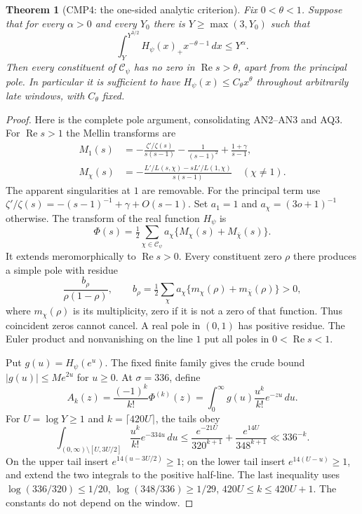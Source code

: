 \documentclass[11pt,a4paper]{article}
\numberwithin{equation}{section}
\newtheorem{theorem}{Theorem}[section]
\theoremstyle{remark}\newtheorem{remark}[theorem]{Remark}
\begin{document}
\begin{theorem}[CMP4: the one-sided analytic criterion]
\label{claim:CMP4}
Fix $0<\theta<1$.  Suppose that for every $\alpha>0$ and every
$Y_0$ there is $Y\ge\max(3,\allowbreak{} Y_0)$ such that
\[
       \int_Y^{Y^{3/2}}H_\psi(x)_+x^{-\theta-1}\,\allowbreak{} dx\le Y^\alpha.
 \tag{CMP.15}
\]
Then every constituent of $\mathcal C_\psi$ has no zero in
$\operatorname{Re}s>\theta$, apart from the principal pole.
In particular it is sufficient to have
$H_\psi(x)\le C_\theta x^\theta$ throughout arbitrarily late
windows, with $C_\theta$ fixed.
\end{theorem}
\begin{proof}
Here is the complete pole argument, consolidating AN2--AN3 and AQ3.
For $\operatorname{Re}s>1$ the Mellin transforms are
\begin{align*}
 M_1(s)&=-\frac{\zeta'/\zeta(s)}{s(s-1)}
             -\frac1{(s-1)^2}+\frac{1+\gamma}{s-1},\\
 M_\chi(s)&=-\frac{L'/L(s,\chi)-sL'/L(1,\chi)}{s(s-1)}
                                                    \quad(\chi\ne1).
\end{align*}
The apparent singularities at $1$ are removable.  For the principal
term use $\zeta'/\zeta(s)=-(s-1)^{-1}+\gamma+O(s-1)$.
Set $a_1=1$ and $a_\chi=(3o+1)^{-1}$ otherwise.  The transform
of the real function $H_\psi$ is
\[
 \Phi(s)=\tfrac12\sum_{\chi\in\mathcal C_\psi}
                    a_\chi\{M_\chi(s)+M_{\bar\chi}(s)\}.
\]
It extends meromorphically to $\operatorname{Re}s>0$.  Every
constituent zero $\rho$ there produces a simple pole with residue
\[
 \frac{b_\rho}{\rho(1-\rho)},\qquad
 b_\rho=\tfrac12\sum_\chi a_\chi
                    \{m_\chi(\rho)+m_{\bar\chi}(\rho)\}>0,
                                                               \tag{CMP.16}
\]
where $m_\chi(\rho)$ is its multiplicity, zero if it is not a
zero of that function.  Thus coincident zeros cannot cancel.  A
real pole in $(0,1)$ has positive residue.  The Euler product and
nonvanishing on the line $1$ put all poles in $0<\operatorname{Re}s<1$.

Put $g(u)=H_\psi(e^u)$.  The fixed finite family gives the crude
bound $|g(u)|\le M e^{2u}$ for $u\ge0$.  At
$\sigma=336$, define
\[
 A_k(z)=\frac{(-1)^k}{k!}\Phi^{(k)}(z)
       =\int_0^\infty g(u)\frac{u^k}{k!}e^{-zu}\,\allowbreak{} du.
\]
For $U=\log Y\ge1$ and $k=\lceil420U\rceil$, the tails obey
\[
 \int_{(0,\infty)\setminus[U,3U/2]}
          \frac{u^k}{k!}e^{-334u}\,\allowbreak{} du
 \le\frac{e^{-21U}}{320^{k+1}}+
                         \frac{e^{14U}}{348^{k+1}}
 \ll336^{-k}.                                      \tag{CMP.17}
\]
On the upper tail insert $e^{14(u-3U/2)}\ge1$; on the lower
tail insert $e^{14(U-u)}\ge1$, and extend the two integrals to
the positive half-line.  The last inequality uses
$\log(336/320)\le1/20$, $\log(348/336)\ge1/29$,
$420U\le k\le420U+1$.  The constants do not depend on the window.


\end{proof}
\end{document}

